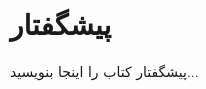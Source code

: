 \documentclass{matinbook}
\begin{document}

\chapter*{پیشگفتار}

پیشگفتار کتاب را اینجا بنویسید...

\clearpage

\tableofcontents
\clearpage

\listoffigures
\clearpage

\listoftables
\clearpage


\mainmatter
\mainmattergeometry

% 
% 
% 
% 
% 
% 
% 
% 

\backmatter
\frontmattergeometry

\printbibliography[title={منابع و مراجع}]

\printindex

\end{document}
